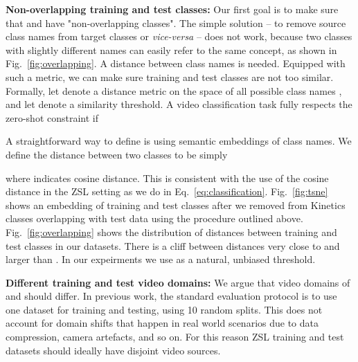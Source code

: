 \documentclass[10pt,twocolumn,letterpaper]{article}
\begin{document}
\textbf{Non-overlapping training and test classes:} Our first goal is to make sure that  and  have "non-overlapping classes". The simple solution -- to remove source class names from target classes or \emph{vice-versa} -- does not work, because two classes with slightly different names can easily refer to the same concept, as shown in Fig.~\ref{fig:overlapping}.
A distance between class names is needed.
Equipped with such a metric, we can make sure training and test classes are not too similar. 
Formally, let  denote a distance metric on the space of all possible class names , and let  denote a similarity threshold. A video classification task fully respects the zero-shot constraint if


A straightforward way to define  is using semantic embeddings of class names. We define the distance between two classes to be simply 

where  indicates cosine distance. This is consistent with the use of the cosine distance in the ZSL setting as we do in Eq.~\ref{eq:classification}. 
Fig.~\ref{fig:tsne} shows an embedding of training and test classes after we removed from Kinetics classes overlapping with test data using the procedure outlined above. Fig.~\ref{fig:overlapping} shows the distribution of distances between training and test classes in our datasets. There is a cliff between distances very close to  and larger than . In our expeirments we use  as a natural, unbiased threshold. 

\textbf{Different training and test video domains:} We argue that video domains of  and  should differ. In previous work, the standard evaluation protocol is to use one dataset for training and testing, using 10 random splits. This does not account for domain shifts that happen in real world scenarios due to data compression, camera artefacts, and so on. For this reason ZSL training and test datasets should ideally have disjoint video sources.
\end{document}
